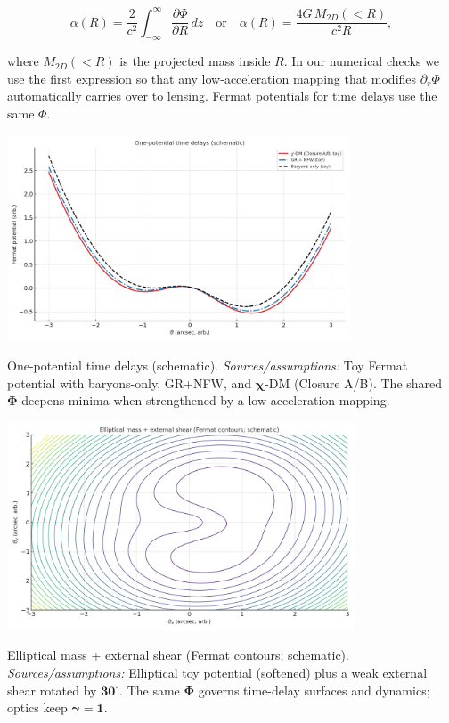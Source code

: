 \documentclass[
]{article}
\begin{document}
\[\alpha(R) = \frac{2}{c^{2}}\int_{- \infty}^{\infty}\frac{\partial\Phi}{\partial R}\, dz\quad\text{or}\quad\alpha(R) = \frac{4G\, M_{2D}( < R)}{c^{2}R},\]

where \(M_{2D}( < R)\) is the projected mass inside \(R\). In our
numerical checks we use the first expression so that any
low-acceleration mapping that modifies \(\partial_{r}\Phi\)
automatically carries over to lensing. Fermat potentials for time delays
use the same \(\Phi\).

\includegraphics[width=4.01002in,height=2.40601in,alt={A graph of a line graph AI-generated content may be incorrect.}]{letter_media/media/image1.png}

One-potential time delays (schematic). \emph{Sources/assumptions:} Toy
Fermat potential with baryons-only, GR+NFW, and \(\mathbf{\chi}\)-DM
(Closure A/B). The shared \(\mathbf{\Phi}\) deepens minima when
strengthened by a low-acceleration mapping.

\includegraphics[width=4.05948in,height=2.43569in,alt={A graph of a graph AI-generated content may be incorrect.}]{letter_media/media/image2.png}

Elliptical mass + external shear (Fermat contours; schematic).
\emph{Sources/assumptions:} Elliptical toy potential (softened) plus a
weak external shear rotated by \(\mathbf{30}^{\mathbf{\circ}}\). The
same \(\mathbf{\Phi}\) governs time-delay surfaces and dynamics; optics
keep \(\mathbf{\gamma}\mathbf{=}\mathbf{1}\).
\end{document}
